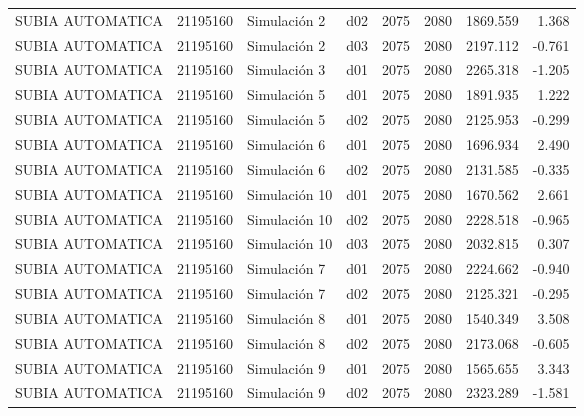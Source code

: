 \begin{landscape}
\begin{longtable}{lrlp{2cm}p{2cm}p{3cm}p{2cm}r}
        SUBIA AUTOMATICA &  21195160 &   Simulación 2 &   d02 &      2075 &     2080 &  1869.559 &     1.368 \\
        SUBIA AUTOMATICA &  21195160 &   Simulación 2 &   d03 &      2075 &     2080 &  2197.112 &    -0.761 \\
        SUBIA AUTOMATICA &  21195160 &   Simulación 3 &   d01 &      2075 &     2080 &  2265.318 &    -1.205 \\
        SUBIA AUTOMATICA &  21195160 &   Simulación 5 &   d01 &      2075 &     2080 &  1891.935 &     1.222 \\
        SUBIA AUTOMATICA &  21195160 &   Simulación 5 &   d02 &      2075 &     2080 &  2125.953 &    -0.299 \\
        SUBIA AUTOMATICA &  21195160 &   Simulación 6 &   d01 &      2075 &     2080 &  1696.934 &     2.490 \\
        SUBIA AUTOMATICA &  21195160 &   Simulación 6 &   d02 &      2075 &     2080 &  2131.585 &    -0.335 \\
        SUBIA AUTOMATICA &  21195160 &  Simulación 10 &   d01 &      2075 &     2080 &  1670.562 &     2.661 \\
        SUBIA AUTOMATICA &  21195160 &  Simulación 10 &   d02 &      2075 &     2080 &  2228.518 &    -0.965 \\
        SUBIA AUTOMATICA &  21195160 &  Simulación 10 &   d03 &      2075 &     2080 &  2032.815 &     0.307 \\
        SUBIA AUTOMATICA &  21195160 &   Simulación 7 &   d01 &      2075 &     2080 &  2224.662 &    -0.940 \\
        SUBIA AUTOMATICA &  21195160 &   Simulación 7 &   d02 &      2075 &     2080 &  2125.321 &    -0.295 \\
        SUBIA AUTOMATICA &  21195160 &   Simulación 8 &   d01 &      2075 &     2080 &  1540.349 &     3.508 \\
        SUBIA AUTOMATICA &  21195160 &   Simulación 8 &   d02 &      2075 &     2080 &  2173.068 &    -0.605 \\
        SUBIA AUTOMATICA &  21195160 &   Simulación 9 &   d01 &      2075 &     2080 &  1565.655 &     3.343 \\
        SUBIA AUTOMATICA &  21195160 &   Simulación 9 &   d02 &      2075 &     2080 &  2323.289 &    -1.581 \\
\end{longtable}

\end{landscape}

